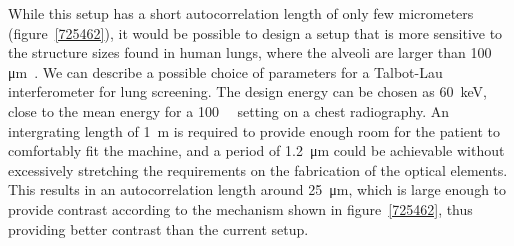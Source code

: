 While this setup has a short autocorrelation length of only few micrometers
(figure~\ref{725462}), it would be possible to design a setup that is more
sensitive to the structure sizes found in human lungs, where the alveoli are
larger than
100 μm~\cite{Ochs_2004}. We can describe a
possible choice of parameters for a Talbot-Lau interferometer for lung
screening. The design energy can be chosen as \SI{60}{\kilo\eV}, close to
the mean energy for a \SI{100}{\kilo\voltpeak} setting on a chest
radiography. An intergrating length of \SI{1}{\meter} is required to provide
enough room for the patient to comfortably fit the machine,
and a period of \SI{1.2}{\micro\meter} could be achievable without
excessively stretching the requirements on the fabrication of the optical
elements. This results in an autocorrelation length around
\SI{25}{\micro\meter}, which is large enough to provide contrast according
to the mechanism shown in figure~\ref{725462}, thus providing better contrast than the
current setup.
